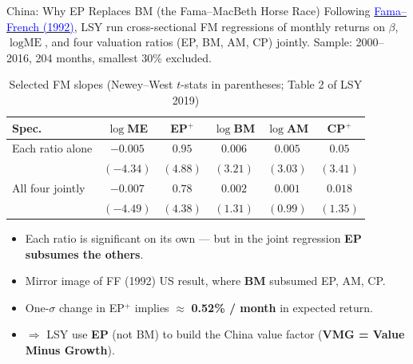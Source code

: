 \documentclass{beamer}
\begin{document}
\begin{frame}{China: Why EP Replaces BM (the Fama--MacBeth Horse Race)}
	\small
	Following \href{https://doi.org/10.1111/j.1540-6261.1992.tb04398.x}{\textcolor{blue}{Fama--French (1992)}}, LSY run cross-sectional FM regressions of monthly returns on $\beta$, $\log\!\text{ME}$, and four valuation ratios (EP, BM, AM, CP) jointly. Sample: 2000--2016, 204 months, smallest 30\% excluded.
	\vspace{2pt}
	\begin{table}
		\centering
		\footnotesize
		\caption{Selected FM slopes (Newey--West $t$-stats in parentheses; Table 2 of LSY 2019)}
		\begin{tabular}{lccccc}
			\hline
			Spec.\ & $\log$ME & EP$^{+}$ & $\log$BM & $\log$AM & CP$^{+}$ \\
			\hline
			Each ratio alone & $-0.005$ & $0.95$ & $0.006$ & $0.005$ & $0.05$ \\
			& $(-4.34)$ & $(4.88)$ & $(3.21)$ & $(3.03)$ & $(3.41)$ \\
			All four jointly & $-0.007$ & $0.78$ & $0.002$ & $0.001$ & $0.018$ \\
			& $(-4.49)$ & $(4.38)$ & $(1.31)$ & $(0.99)$ & $(1.35)$ \\
			\hline
		\end{tabular}
	\end{table}
	\vspace{2pt}
	\begin{itemize}\setlength\itemsep{1pt}
		\item Each ratio is significant on its own --- but in the joint regression \textbf{EP subsumes the others}.
		\item Mirror image of FF (1992) US result, where \textbf{BM} subsumed EP, AM, CP.
		\item One-$\sigma$ change in EP$^{+}$ implies $\approx$ \textbf{0.52\% / month} in expected return.
		\item $\Rightarrow$ LSY use \textbf{EP} (not BM) to build the China value factor (\textbf{VMG = Value Minus Growth}).
	\end{itemize}
\end{frame}
\end{document}
